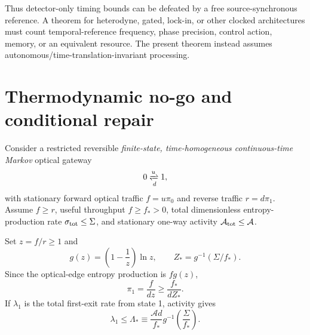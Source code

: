 \documentclass[aps,prapplied,preprint,nofootinbib]{revtex4-2}
\begin{document}
Thus detector-only timing bounds can be defeated by a free source-synchronous reference. A theorem for heterodyne, gated, lock-in, or other clocked architectures must count temporal-reference frequency, phase precision, control action, memory, or an equivalent resource. The present theorem instead assumes autonomous/time-translation-invariant processing.

\section{Thermodynamic no-go and conditional repair}
\label{sec:thermo}

Consider a restricted reversible \emph{finite-state, time-homogeneous continuous-time Markov} optical gateway
\begin{equation}
0\xrightleftharpoons[d]{u}1,
\end{equation}
with stationary forward optical traffic $f=u\pi_0$ and reverse traffic $r=d\pi_1$. Assume $f\ge r$, useful throughput $f\ge f_*>0$, total dimensionless entropy-production rate $\sigma_{\rm tot}\le\Sigma$, and stationary one-way activity $\mathcal A_{\rm tot}\le\mathcal A$.

Set $z=f/r\ge1$ and
\begin{equation}
g(z)=\left(1-\frac1z\right)\ln z,
\qquad
Z_*=g^{-1}(\Sigma/f_*).
\end{equation}
Since the optical-edge entropy production is $f g(z)$,
\begin{equation}
\pi_1=\frac{f}{dz}\ge\frac{f_*}{dZ_*}.
\end{equation}
If $\lambda_1$ is the total first-exit rate from state 1, activity gives
\begin{equation}
\boxed{
\lambda_1\le\Lambda_*
\equiv\frac{\mathcal A d}{f_*}
 g^{-1}\!\left(\frac{\Sigma}{f_*}\right).}
\label{eq:Lstar}
\end{equation}
\end{document}
